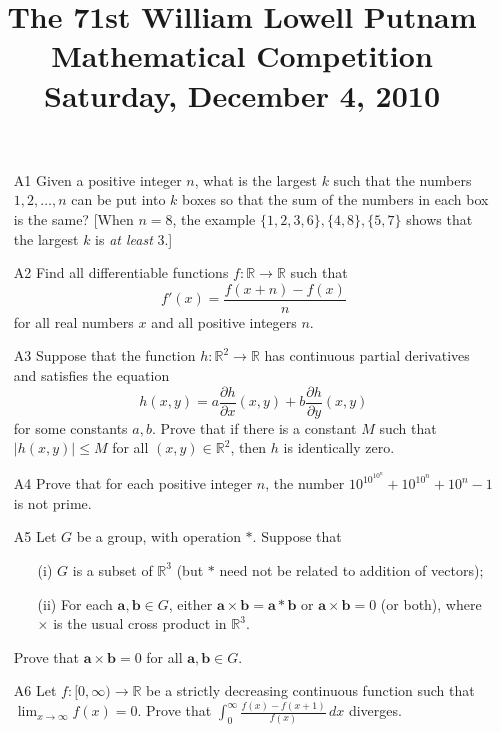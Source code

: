 \documentclass[amssymb,twocolumn,pra,10pt,aps]{revtex4-1}
\begin{document}
\title{The 71st William Lowell Putnam Mathematical Competition \\
    Saturday, December 4, 2010}
\maketitle

\begin{itemize}

\item[A1]
Given a positive integer $n$, what is the largest $k$ such that the
numbers $1,2,\dots,n$ can be put into $k$ boxes so that the sum of the numbers
in each box is the same? [When $n=8$, the example $\{1,2,3,6\}, \{4,8\}, \{5,7\}$
shows that the largest $k$ is \emph{at least} 3.]

\item[A2]
Find all differentiable functions $f:\mathbb{R} \to \mathbb{R}$ such that
\[
f'(x) = \frac{f(x+n)-f(x)}{n}
\]
for all real numbers $x$ and all positive integers $n$.

\item[A3]
 Suppose that the function $h:\mathbb{R}^2\to \mathbb{R}$ has continuous partial
derivatives and satisfies the equation
\[
h(x,y) = a \frac{\partial h}{\partial x}(x,y) +
b \frac{\partial h}{\partial y}(x,y)
\]
for some constants $a,b$. Prove that if there is a constant $M$ such that
$|h(x,y)|\leq M$ for all $(x,y) \in \mathbb{R}^2$, then $h$ is identically zero.

\item[A4]
Prove that for each positive integer $n$, the number
$10^{10^{10^n}} + 10^{10^n} + 10^n - 1$
is not prime.


\item[A5]
Let $G$ be a group, with operation $*$. Suppose that
\begin{enumerate}
\item[(i)]
$G$ is a subset of $\mathbb{R}^3$ (but $*$ need not be related to addition of vectors);
\item[(ii)]
For each $\mathbf{a},\mathbf{b} \in G$, either $\mathbf{a}\times \mathbf{b} = \mathbf{a}*\mathbf{b}$
or $\mathbf{a}\times \mathbf{b} = 0$ (or
both), where $\times$ is the usual cross product in $\mathbb{R}^3$.
\end{enumerate}
Prove that $\mathbf{a} \times \mathbf{b} = 0$ for all $\mathbf{a}, \mathbf{b} \in G$.

\item[A6]
Let $f:[0,\infty)\to \mathbb{R}$ be a strictly decreasing continuous function
such that $\lim_{x\to\infty} f(x) = 0$. Prove that
$\int_0^\infty \frac{f(x)-f(x+1)}{f(x)}\,dx$ diverges.


\end{itemize}
\end{document}
